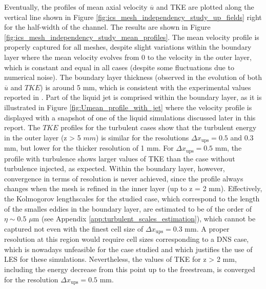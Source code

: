 Eventually, the profiles of mean axial velocity $\overline{u}$ and TKE are plotted along the vertical line shown in Figure \ref{fig:ics_mesh_independency_study_up_fields} right for the half-width of the channel. The results are shown in Figure \ref{fig:ics_mesh_independency_study_mean_profiles}. The mean velocity profile is properly captured for all meshes, despite slight variations within the boundary layer where the mean velocity evolves from 0 to the velocity in the outer layer, which is constant and equal in all cases (despite some fluctuations due to numerical noise). The boundary layer thickness (observed in the evolution of both $\overline{u}$ and $TKE$) is around 5 mm, which is consistent with the experimental values reported in . Part of the liquid jet is comprised within the boundary layer, as it is illustrated in Figure \ref{fig:Umean_profile_with_jet} where the velocity profile is displayed with a snapshot of one of the liquid simulations discussed later in this report. The $TKE$ profiles for the turbulent cases show that the turbulent energy in the outer layer (z > 5 $mm$) is similar for the resolutions $\Delta x_\mathrm{ups} = 0.5$ and $0.3$ mm, but lower for the thicker resolution of 1 mm. For $\Delta x_\mathrm{ups} = 0.5$ mm, the profile with turbulence shows larger values of TKE than the case without turbulence injected, as expected. Within the boundary layer, however, convergence in terms of resolution is never achieved, since the profile always changes when the mesh is refined in the inner layer (up to z = 2 mm). Effectively, the Kolmogorov lengthscales for the studied case, which correspond to the length of the smalles eddies in the boundary layer, are estimated to be of the order of $\eta \sim 0.5$ $\mu$m (see Appendix \ref{app:turbulent_scales_estimation}), which cannot be captured not even with the finest cell size of $\Delta x_\mathrm{ups} = 0.3$ mm. A proper resolution at this region would require cell sizes corresponding to a DNS case, which is nowadays unfeasible for the case studied and which justifies the use of LES for these simulations. Nevertheless, the values of TKE for z > 2 mm, including the energy decrease from this point up to the freestream, is converged for the resolution $\Delta x_\mathrm{ups} = 0.5$ mm. \\

